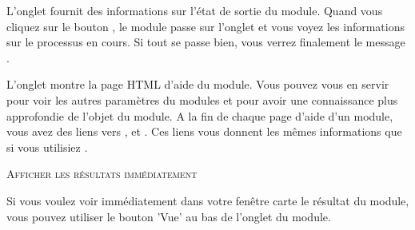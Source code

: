 
L'onglet  fournit des informations sur l'état de sortie du module. Quand vous cliquez sur le bouton , le module passe sur l'onglet  et vous voyez les informations sur le processus en cours. Si tout se passe bien, vous verrez finalement le message .


L'onglet  montre la page HTML d'aide du module. Vous pouvez vous en servir pour voir les autres paramètres du modules et pour avoir une
connaissance plus approfondie de l'objet du module. A la fin de chaque page d'aide d'un module, vous avez des liens vers ,
 et . Ces liens vous donnent les mêmes informations que si vous utilisiez .

\begin{Tip}\caption{\textsc{Afficher les résultats immédiatement}}
Si vous voulez voir immédiatement dans votre fenêtre carte le résultat du module, vous pouvez utiliser le bouton 'Vue' au bas de l'onglet du module.
\end{Tip} 


